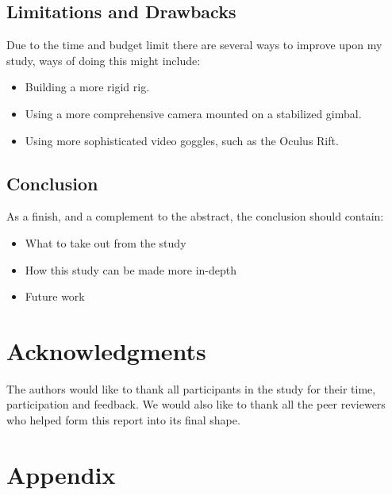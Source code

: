 \documentclass[runningheads,a4paper,oribibl]{llncs}
\begin{document}
\subsection{Limitations and Drawbacks}
Due to the time and budget limit there are several ways to improve upon my study, ways of doing this might include:
\begin{itemize}
	\item Building a more rigid rig.
	\item Using a more comprehensive camera mounted on a stabilized gimbal.
	\item Using more sophisticated video goggles, such as the Oculus Rift.
\end{itemize}




\subsection{Conclusion}
As a finish, and a complement to the abstract, the conclusion should contain:
\begin{itemize}
	\item What to take out from the study
	\item How this study can be made more in-depth
	\item Future work
\end{itemize}












\section{Acknowledgments}
The authors would like to thank all participants in the study for their time, participation and feedback. We would also like to thank all the peer reviewers who helped form this report into its final shape.








% 



\newpage
\appendix

\section{Appendix}


\end{document}
